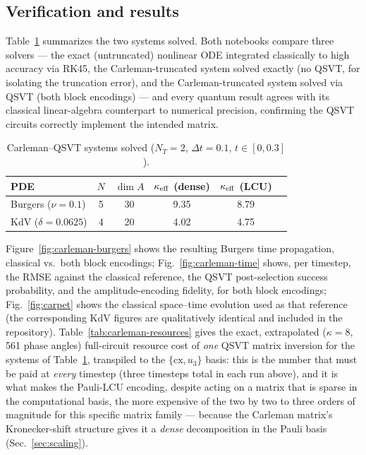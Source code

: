 \documentclass[aps,pra,twocolumn,notitlepage,superscriptaddress,floatfix,10pt]{revtex4-2}
\begin{document}
\subsection{Verification and results}
Table~\ref{tab:carleman} summarizes the two systems solved. Both notebooks compare three solvers ---
the exact (untruncated) nonlinear ODE integrated classically to high accuracy via RK45, the
Carleman-truncated system solved exactly (no QSVT, for isolating the truncation error), and the
Carleman-truncated system solved via QSVT (both block encodings) --- and every quantum result agrees
with its classical linear-algebra counterpart to numerical precision, confirming the QSVT circuits
correctly implement the intended matrix.

\begin{table}[t]
\caption{Carleman--QSVT systems solved ($N_T=2$, $\Delta t=0.1$, $t\in[0,0.3]$).}
\label{tab:carleman}
\begin{ruledtabular}
\begin{tabular}{lccccc}
PDE & $N$ & $\dim A$ & $\kappa_{\rm eff}$ (dense) & $\kappa_{\rm eff}$ (LCU) \\
\hline
Burgers ($\nu=0.1$) & 5 & 30 & 9.35 & 8.79 \\
KdV ($\delta=0.0625$) & 4 & 20 & 4.02 & 4.75 \\
\end{tabular}
\end{ruledtabular}
\end{table}

Figure~\ref{fig:carleman-burgers} shows the resulting Burgers time propagation, classical vs.\ both
block encodings; Fig.~\ref{fig:carleman-time} shows, per timestep, the RMSE against the classical
reference, the QSVT post-selection success probability, and the amplitude-encoding fidelity, for both
block encodings; Fig.~\ref{fig:carpet} shows the classical space--time evolution used as that
reference (the corresponding KdV figures are qualitatively identical and included in the
repository). Table~\ref{tab:carleman-resources} gives the exact, extrapolated ($\kappa=8$,
561 phase angles) full-circuit resource cost of \emph{one} QSVT matrix inversion for the systems of
Table~\ref{tab:carleman}, transpiled to the $\{\mathrm{cx},u_3\}$ basis: this is the number that must
be paid at \emph{every} timestep (three timesteps total in each run above), and it is what makes the
Pauli-LCU encoding, despite acting on a matrix that is sparse in the computational basis, the more
expensive of the two by two to three orders of magnitude for this specific matrix family --- because
the Carleman matrix's Kronecker-shift structure gives it a \emph{dense} decomposition in the Pauli
basis (Sec.~\ref{sec:scaling}).
\end{document}
